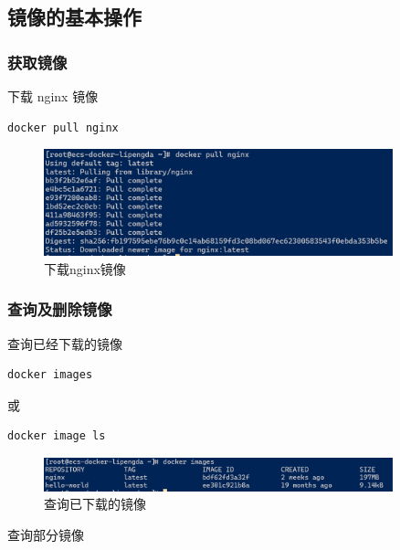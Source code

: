 \documentclass{article}
\begin{document}
\subsection{镜像的基本操作}

\label{subsec:image-management}

\subsubsection{获取镜像}

下载 nginx 镜像

\begin{lstlisting}[language=bash]
    docker pull nginx
\end{lstlisting}

\begin{figure}[H]
\centering
\includegraphics[width=0.9\textwidth]{img/2.3.1.1.png}
\caption{下载nginx镜像}
\end{figure}

\subsubsection{查询及删除镜像}

查询已经下载的镜像

\begin{lstlisting}[language=bash]
    docker images
\end{lstlisting}

或

\begin{lstlisting}[language=bash]
    docker image ls
\end{lstlisting}

\begin{figure}[H]
\centering
\includegraphics[width=0.9\textwidth]{img/0.2.3.2.1.png}
\caption{查询已下载的镜像}
\end{figure}

查询部分镜像
\end{document}
